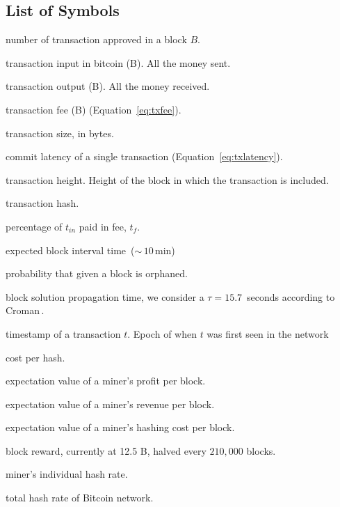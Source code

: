 \documentclass[USenglish]{uit-thesis}
\def\bitcoin{\leavevmode\rlap{\hskip.5pt-}B}
\begin{document}
\begin{appendices}
\chapter{List of Symbols}
\label{app:LOS}
\begin{description}[leftmargin=!, labelwidth=\widthof{\bfseries $M_{demand}(b)$ }]
	\setlength\itemsep{1em}
	\item [$t_B$] number of transaction approved in a block $B$.
	\item [$t_{in}$] transaction input in bitcoin (\bitcoin). All the money sent.
	\item [$t_{ou}$] transaction output (\bitcoin). All the money received.
	\item [$t_{f}$] transaction fee (\bitcoin) (Equation~\ref{eq:txfee}).
	\item [$t_q$] transaction size, in bytes.
	\item [$t_l$] commit latency of a single transaction (Equation~\ref{eq:txlatency}).
	\item [$t_h$] transaction height. Height of the block in which the transaction is included.
	\item [$t_{ha}$] transaction hash.
	\item [$t_\%$] percentage of $t_{in}$ paid in fee, $t_f$.
	\item [$\mathcal{T}$] expected block interval time~($\sim$\,$10$\,min)
	\item [$\mathbb{P}_{orphan}$] probability that given a block is orphaned.
	\item [$\tau$] block solution propagation time, we consider a $\tau = 15.7$\,
	seconds according to Croman\,\cite{croman2016}. %
	\item [$t_{epoch}$] timestamp of a transaction $t$.
	Epoch of when $t$ was first seen in the network
	\item [$\eta$] cost per hash.
	\item [$\langle \Pi \rangle$] expectation value of a miner’s profit per block.
	\item [$\langle V\rangle$] expectation value of a miner’s revenue per block.
	\item [$\langle C\rangle$] expectation value of a miner's hashing cost per block.
	\item [$R$] block reward, currently at 12.5 \bitcoin, halved every $210,000$ blocks.
	\item [$h$] miner's individual hash rate.
	\item [$H$] total hash rate of Bitcoin network.

\end{description}
\end{appendices}
\end{document}
